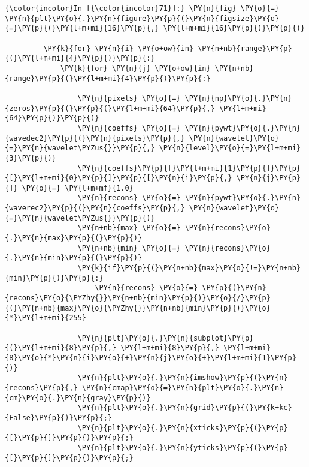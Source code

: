     \begin{Verbatim}[commandchars=\\\{\}]
{\color{incolor}In [{\color{incolor}71}]:} \PY{n}{fig} \PY{o}{=} \PY{n}{plt}\PY{o}{.}\PY{n}{figure}\PY{p}{(}\PY{n}{figsize}\PY{o}{=}\PY{p}{(}\PY{l+m+mi}{16}\PY{p}{,} \PY{l+m+mi}{16}\PY{p}{)}\PY{p}{)}
         
         \PY{k}{for} \PY{n}{i} \PY{o+ow}{in} \PY{n+nb}{range}\PY{p}{(}\PY{l+m+mi}{4}\PY{p}{)}\PY{p}{:}
             \PY{k}{for} \PY{n}{j} \PY{o+ow}{in} \PY{n+nb}{range}\PY{p}{(}\PY{l+m+mi}{4}\PY{p}{)}\PY{p}{:}
         
                 \PY{n}{pixels} \PY{o}{=} \PY{n}{np}\PY{o}{.}\PY{n}{zeros}\PY{p}{(}\PY{p}{(}\PY{l+m+mi}{64}\PY{p}{,} \PY{l+m+mi}{64}\PY{p}{)}\PY{p}{)}
                 \PY{n}{coeffs} \PY{o}{=} \PY{n}{pywt}\PY{o}{.}\PY{n}{wavedec2}\PY{p}{(}\PY{n}{pixels}\PY{p}{,} \PY{n}{wavelet}\PY{o}{=}\PY{n}{wavelet\PYZus{}}\PY{p}{,} \PY{n}{level}\PY{o}{=}\PY{l+m+mi}{3}\PY{p}{)}
                 \PY{n}{coeffs}\PY{p}{[}\PY{l+m+mi}{1}\PY{p}{]}\PY{p}{[}\PY{l+m+mi}{0}\PY{p}{]}\PY{p}{[}\PY{n}{i}\PY{p}{,} \PY{n}{j}\PY{p}{]} \PY{o}{=} \PY{l+m+mf}{1.0}
                 \PY{n}{recons} \PY{o}{=} \PY{n}{pywt}\PY{o}{.}\PY{n}{waverec2}\PY{p}{(}\PY{n}{coeffs}\PY{p}{,} \PY{n}{wavelet}\PY{o}{=}\PY{n}{wavelet\PYZus{}}\PY{p}{)}
                 \PY{n+nb}{max} \PY{o}{=} \PY{n}{recons}\PY{o}{.}\PY{n}{max}\PY{p}{(}\PY{p}{)}
                 \PY{n+nb}{min} \PY{o}{=} \PY{n}{recons}\PY{o}{.}\PY{n}{min}\PY{p}{(}\PY{p}{)}
                 \PY{k}{if}\PY{p}{(}\PY{n+nb}{max}\PY{o}{!=}\PY{n+nb}{min}\PY{p}{)}\PY{p}{:}
                     \PY{n}{recons} \PY{o}{=} \PY{p}{(}\PY{n}{recons}\PY{o}{\PYZhy{}}\PY{n+nb}{min}\PY{p}{)}\PY{o}{/}\PY{p}{(}\PY{n+nb}{max}\PY{o}{\PYZhy{}}\PY{n+nb}{min}\PY{p}{)}\PY{o}{*}\PY{l+m+mi}{255}
                     
                 \PY{n}{plt}\PY{o}{.}\PY{n}{subplot}\PY{p}{(}\PY{l+m+mi}{8}\PY{p}{,} \PY{l+m+mi}{8}\PY{p}{,} \PY{l+m+mi}{8}\PY{o}{*}\PY{n}{i}\PY{o}{+}\PY{n}{j}\PY{o}{+}\PY{l+m+mi}{1}\PY{p}{)}
                 \PY{n}{plt}\PY{o}{.}\PY{n}{imshow}\PY{p}{(}\PY{n}{recons}\PY{p}{,} \PY{n}{cmap}\PY{o}{=}\PY{n}{plt}\PY{o}{.}\PY{n}{cm}\PY{o}{.}\PY{n}{gray}\PY{p}{)}
                 \PY{n}{plt}\PY{o}{.}\PY{n}{grid}\PY{p}{(}\PY{k+kc}{False}\PY{p}{)}\PY{p}{;}
                 \PY{n}{plt}\PY{o}{.}\PY{n}{xticks}\PY{p}{(}\PY{p}{[}\PY{p}{]}\PY{p}{)}\PY{p}{;}
                 \PY{n}{plt}\PY{o}{.}\PY{n}{yticks}\PY{p}{(}\PY{p}{[}\PY{p}{]}\PY{p}{)}\PY{p}{;}
\end{Verbatim}


